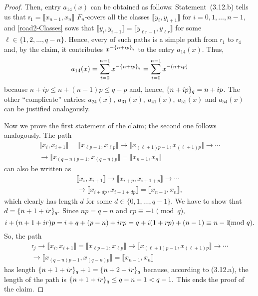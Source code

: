 \documentclass[a4paper, 11pt]{amsart}
\numberwithin{equation}{section}
\theoremstyle{customnumberedtheorem}
\theoremstyle{definitionwithbfnote}
\newcommand{\bigBIclass}[1]{\ensuremath{\bigl\llbracket #1\bigr\rrbracket}}
\newcommand{\modulo}[2]{\{#1\}\sb{#2}}
\begin{document}
\begin{proof}
Then, entry $a_{14}(x)$ can be obtained as follows:
Statement~(3.12.b) tells us that
$\textsf{r}_1 = \bigBIclass{x_{n-1},x_{n}}$ $F_n$-covers all the classes
$\bigBIclass{y_i,y_{i+1}}$ for $i=0,1,\dots, n-1,$
and \eqref{road2-Classes} sows that
$\bigBIclass{y_i, y_{i+1}} = \bigBIclass{y_{\ell r-1},y_{\ell r}}$
for some $\ell \in \{1,2,\dots,q-n\}.$
Hence, every of such paths is a simple path from
$\textsf{r}_1$ to $\textsf{r}_4$ and, by the claim,
it contributes $x^{-\modulo{n+ip}{q}}$ to the entry $a_{14}(x).$
Thus,
\[
a_{14}(x) = \sum_{i=0}^{n-1} x^{-\modulo{n+ip}{q}}
          = \sum_{i=0}^{n-1} x^{-(n+ip)}
\]
because $n + ip \le n + (n-1)p \le q-p$ and, hence,
$\modulo{n+ip}{q} = n+ip$.
The other ``complicate'' entries:
$a_{24}(x),\ a_{31}(x),\ a_{41}(x),\ a_{51}(x)$ and $a_{54}(x)$
can be justified analogously.

Now we prove the first statement of the claim;
the second one follows analogously.
The path
\begin{multline*}
 \bigBIclass{x_i, x_{i+1}} =
   \bigBIclass{x_{\ell p-1},x_{\ell p}} \longrightarrow
   \bigBIclass{x_{(\ell+1)p - 1},x_{(\ell+1)p}} \longrightarrow\cdots\\
 \longrightarrow \bigBIclass{x_{(q-n)p-1},x_{(q-n)p}} = \bigBIclass{x_{n-1},x_{n}}
\end{multline*}
can also be written as
\begin{multline*}
 \bigBIclass{x_i, x_{i+1}} \longrightarrow
   \bigBIclass{x_{i+p},x_{i+1+p}} \longrightarrow\cdots\\
 \longrightarrow \bigBIclass{x_{i+d p},x_{i+1+dp}} = \bigBIclass{x_{n-1},x_{n}},
\end{multline*}
which clearly has length $d$ for some $d\in \{0,1,\dots,q-1\}.$
We have to show that $d = \modulo{n+1+ir}{q}.$
Since $np = q-n$ and $rp \equiv -1 \pmod{q},$
\[
 i + (n+1+ir)p = i + q + (p-n) + irp = q + i (1 + rp) + (n-1) \equiv n-1\mkern-12mu\pmod{q}.
\]
So, the path
\begin{multline*}
 \textsf{r}_j \longrightarrow \bigBIclass{x_i, x_{i+1}} =
   \bigBIclass{x_{\ell p-1},x_{\ell p}} \longrightarrow
   \bigBIclass{x_{(\ell+1)p - 1},x_{(\ell+1)p}} \longrightarrow\cdots\\
 \longrightarrow \bigBIclass{x_{(q-n)p-1},x_{(q-n)p}} = \bigBIclass{x_{n-1},x_{n}}
\end{multline*}
has length $\modulo{n+1+ir}{q} + 1 = \modulo{n+2+ir}{q}$ because,
according to (3.12.a), the length of the path is
$\modulo{n+1+ir}{q} \le q-n-1 < q-1.$
This ends the proof of the claim.


\end{proof}
\end{document}
